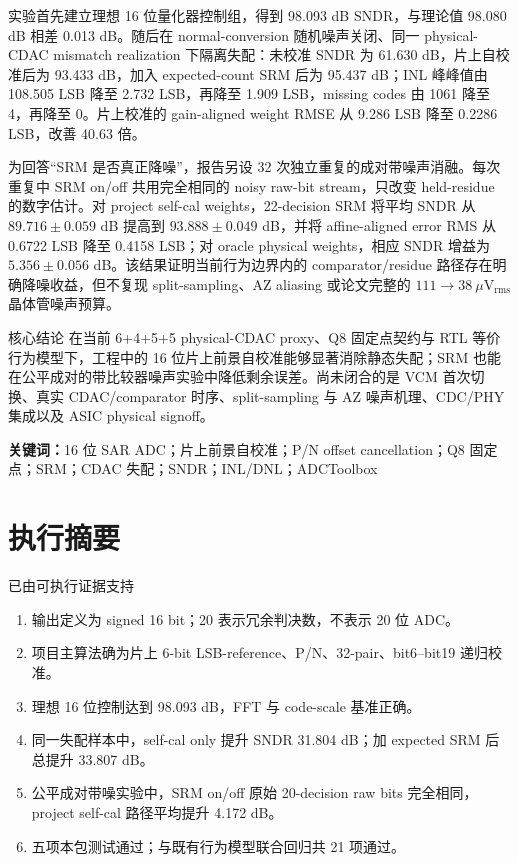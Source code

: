 \documentclass[UTF8,fontset=none,a4paper,11pt,openany]{ctexrep}
\begin{document}
实验首先建立理想 16 位量化器控制组，得到 98.093 dB SNDR，与理论值 98.080 dB 相差 0.013 dB。随后在 normal-conversion 随机噪声关闭、同一 physical-CDAC mismatch realization 下隔离失配：未校准 SNDR 为 61.630 dB，片上自校准后为 93.433 dB，加入 expected-count SRM 后为 95.437 dB；INL 峰峰值由 108.505 LSB 降至 2.732 LSB，再降至 1.909 LSB，missing codes 由 1061 降至 4，再降至 0。片上校准的 gain-aligned weight RMSE 从 9.286 LSB 降至 0.2286 LSB，改善 40.63 倍。

为回答“SRM 是否真正降噪”，报告另设 32 次独立重复的成对带噪声消融。每次重复中 SRM on/off 共用完全相同的 noisy raw-bit stream，只改变 held-residue 的数字估计。对 project self-cal weights，22-decision SRM 将平均 SNDR 从 $89.716\pm0.059$ dB 提高到 $93.888\pm0.049$ dB，并将 affine-aligned error RMS 从 0.6722 LSB 降至 0.4158 LSB；对 oracle physical weights，相应 SNDR 增益为 $5.356\pm0.056$ dB。该结果证明当前行为边界内的 comparator/residue 路径存在明确降噪收益，但不复现 split-sampling、AZ aliasing 或论文完整的 $111\rightarrow38~\mu\mathrm{V}_{\mathrm{rms}}$ 晶体管噪声预算。

\begin{evidencebox}{核心结论}
在当前 6+4+5+5 physical-CDAC proxy、Q8 固定点契约与 RTL 等价行为模型下，工程中的 16 位片上前景自校准能够显著消除静态失配；SRM 也能在公平成对的带比较器噪声实验中降低剩余误差。尚未闭合的是 VCM 首次切换、真实 CDAC/comparator 时序、split-sampling 与 AZ 噪声机理、CDC/PHY 集成以及 ASIC physical signoff。
\end{evidencebox}

\noindent\textbf{关键词：}16 位 SAR ADC；片上前景自校准；P/N offset cancellation；Q8 固定点；SRM；CDAC 失配；SNDR；INL/DNL；ADCToolbox

\clearpage
\chapter*{执行摘要}

\begin{passbox}{已由可执行证据支持}
\begin{enumerate}
  \item 输出定义为 signed 16 bit；20 表示冗余判决数，不表示 20 位 ADC。
  \item 项目主算法确为片上 6-bit LSB-reference、P/N、32-pair、bit6--bit19 递归校准。
  \item 理想 16 位控制达到 98.093 dB，FFT 与 code-scale 基准正确。
  \item 同一失配样本中，self-cal only 提升 SNDR 31.804 dB；加 expected SRM 后总提升 33.807 dB。
  \item 公平成对带噪实验中，SRM on/off 原始 20-decision raw bits 完全相同，project self-cal 路径平均提升 4.172 dB。
  \item 五项本包测试通过；与既有行为模型联合回归共 21 项通过。
\end{enumerate}
\end{passbox}
\end{document}
